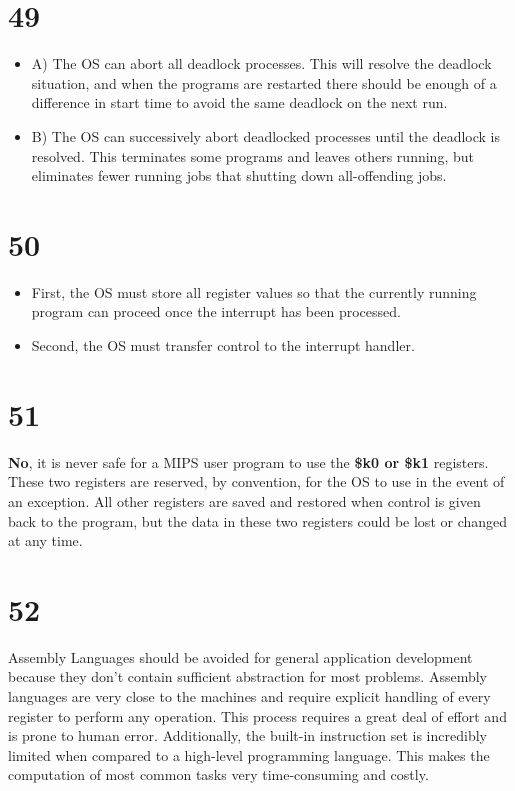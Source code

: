 \documentclass[a4paper,11pt]{article}
\begin{document}
\section*{49}
\begin{itemize}
  \item A) The OS can abort all deadlock processes.  This will resolve the deadlock situation, and when the programs are restarted there should be enough of a difference in start time to avoid the same deadlock on the next run.  
  \item B) The OS can successively abort deadlocked processes until the deadlock is resolved.  This terminates some programs and leaves others running, but eliminates fewer running jobs that shutting down all-offending jobs.  
\end{itemize}


\section*{50}
\begin{itemize}
  \item First, the OS must store all register values so that the currently running program can proceed once the interrupt has been processed.
  \item Second, the OS must transfer control to the interrupt handler.
\end{itemize}


\section*{51}
{\bf No}, it is never safe for a MIPS user program to use the {\bf \$k0 or \$k1} registers.  These two registers are reserved, by convention, for the OS to use in the event of an exception.  All other registers are saved and restored when control is given back to the program, but the data in these two registers could be lost or changed at any time.


\section*{52}
Assembly Languages should be avoided for general application development because they don't contain sufficient abstraction for most problems.  Assembly languages are very close to the machines and require explicit handling of every register to perform any operation.  This process requires a great deal of effort and is prone to human error.  Additionally, the built-in instruction set is incredibly limited when compared to a high-level programming language.  This makes the computation of most common tasks very time-consuming and costly.
\end{document}
